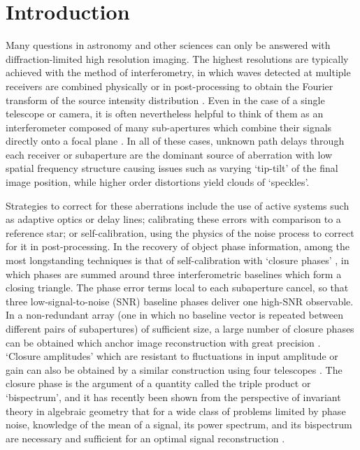 \documentclass[modern]{aastex63}
\begin{document}
\section{Introduction} 
\label{sec:intro}
Many questions in astronomy and other sciences can only be answered with diffraction-limited high resolution imaging. The highest resolutions are typically achieved with the method of interferometry, in which waves detected at multiple receivers are combined physically or in post-processing to obtain the Fourier transform of the source intensity distribution \citep{vc34,zernike38}. Even in the case of a single telescope or camera, it is often nevertheless helpful to think of them as an interferometer composed of many sub-apertures which combine their signals directly onto a focal plane \citep[a `Fizeau interferometer':][]{fizeau1868}. In all of these cases, unknown path delays through each receiver or subaperture are the dominant source of aberration with low spatial frequency structure causing issues such as varying `tip-tilt' of the final image position, while higher order distortions yield clouds of `speckles'.

Strategies to correct for these aberrations include the use of active systems such as adaptive optics or delay lines; calibrating these errors with comparison to a reference star; or self-calibration, using the physics of the noise process to correct for it in post-processing.
In the recovery of object phase information, among the most longstanding techniques is that of self-calibration with `closure phases' \citep[introduced in the context of radio astronomy by][]{jennison58}, in which phases are summed around three interferometric baselines which form a closing triangle. The phase error terms local to each subaperture cancel, so that three low-signal-to-noise (SNR) baseline phases deliver one high-SNR observable. In a non-redundant array (one in which no baseline vector is repeated between different pairs of subapertures) of sufficient size, a large number of closure phases can be obtained which anchor image reconstruction with great precision \citep{chael18}. `Closure amplitudes' which are resistant to fluctuations in input amplitude or gain can also be obtained by a similar construction using four telescopes \citep{twiss60,blackburn20}. The closure phase is the argument of a quantity called the triple product or `bispectrum', and it has recently been shown from the perspective of invariant theory in algebraic geometry that for a wide class of problems limited by phase noise, knowledge of the mean of a signal, its power spectrum, and its bispectrum are necessary and sufficient for an optimal signal reconstruction \citep{bandeira17}.
\end{document}
